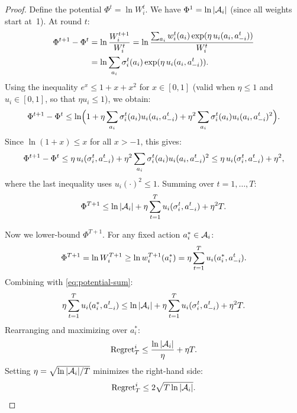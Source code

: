 \documentclass[11pt,a4paper]{article}
\begin{document}
\begin{proof}
Define the potential $\Phi^t = \ln W_i^t$.  We have $\Phi^1 =
\ln |\mathcal{A}_i|$ (since all weights start at~1).  At round $t$:
\begin{align}
  \Phi^{t+1} - \Phi^t
  &= \ln \frac{W_i^{t+1}}{W_i^t}
  = \ln \frac{\sum_{a_i} w_i^t(a_i)
    \exp(\eta \, u_i(a_i, a_{-i}^t))}{W_i^t} \notag \\
  &= \ln \sum_{a_i} \sigma_i^t(a_i)
    \exp(\eta \, u_i(a_i, a_{-i}^t)).
    \label{eq:potential-step}
\end{align}
Using the inequality $e^x \leq 1 + x + x^2$ for $x \in [0, 1]$
(valid when $\eta \leq 1$ and $u_i \in [0,1]$, so that
$\eta u_i \leq 1$), we obtain:
\begin{equation}
\label{eq:exp-bound}
  \Phi^{t+1} - \Phi^t
  \leq \ln\Bigl(1 + \eta \sum_{a_i} \sigma_i^t(a_i)
    u_i(a_i, a_{-i}^t)
    + \eta^2 \sum_{a_i} \sigma_i^t(a_i)
    u_i(a_i, a_{-i}^t)^2\Bigr).
\end{equation}
Since $\ln(1+x) \leq x$ for all $x > -1$, this gives:
\begin{equation}
  \Phi^{t+1} - \Phi^t
  \leq \eta \, u_i(\sigma_i^t, a_{-i}^t)
    + \eta^2 \sum_{a_i} \sigma_i^t(a_i)
    u_i(a_i, a_{-i}^t)^2
  \leq \eta \, u_i(\sigma_i^t, a_{-i}^t) + \eta^2,
\end{equation}
where the last inequality uses $u_i(\cdot)^2 \leq 1$.
Summing over $t = 1, \ldots, T$:
\begin{equation}
\label{eq:potential-sum}
  \Phi^{T+1} \leq \ln |\mathcal{A}_i|
    + \eta \sum_{t=1}^{T} u_i(\sigma_i^t, a_{-i}^t) + \eta^2 T.
\end{equation}

Now we lower-bound $\Phi^{T+1}$.  For any fixed action
$a_i^* \in \mathcal{A}_i$:
\begin{equation}
  \Phi^{T+1} = \ln W_i^{T+1}
  \geq \ln w_i^{T+1}(a_i^*)
  = \eta \sum_{t=1}^{T} u_i(a_i^*, a_{-i}^t).
\end{equation}
Combining with \eqref{eq:potential-sum}:
\begin{equation}
  \eta \sum_{t=1}^{T} u_i(a_i^*, a_{-i}^t)
  \leq \ln |\mathcal{A}_i|
    + \eta \sum_{t=1}^{T} u_i(\sigma_i^t, a_{-i}^t) + \eta^2 T.
\end{equation}
Rearranging and maximizing over $a_i^*$:
\begin{equation}
  \mathrm{Regret}_T^i \leq \frac{\ln |\mathcal{A}_i|}{\eta} + \eta T.
\end{equation}
Setting $\eta = \sqrt{\ln |\mathcal{A}_i| / T}$ minimizes the right-hand
side:
\begin{equation}
  \mathrm{Regret}_T^i \leq 2\sqrt{T \ln |\mathcal{A}_i|}.
\end{equation}
\end{proof}
\end{document}
